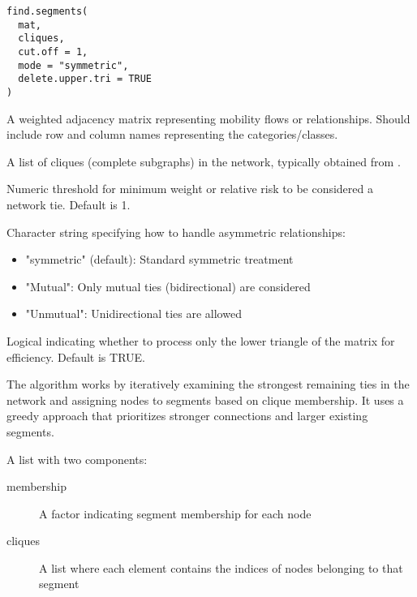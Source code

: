 \documentclass[a4paper]{book}
\begin{document}
%
\begin{Usage}
\begin{verbatim}
find.segments(
  mat,
  cliques,
  cut.off = 1,
  mode = "symmetric",
  delete.upper.tri = TRUE
)
\end{verbatim}
\end{Usage}
%
\begin{Arguments}
\begin{ldescription}
\item[\code{mat}] A weighted adjacency matrix representing mobility flows or relationships.
Should include row and column names representing the categories/classes.

\item[\code{cliques}] A list of cliques (complete subgraphs) in the network, typically
obtained from .

\item[\code{cut.off}] Numeric threshold for minimum weight or relative risk to be 
considered a network tie. Default is 1.

\item[\code{mode}] Character string specifying how to handle asymmetric relationships:
\begin{itemize}

\item{} "symmetric" (default): Standard symmetric treatment
\item{} "Mutual": Only mutual ties (bidirectional) are considered
\item{} "Unmutual": Unidirectional ties are allowed

\end{itemize}


\item[\code{delete.upper.tri}] Logical indicating whether to process only the lower 
triangle of the matrix for efficiency. Default is TRUE.
\end{ldescription}
\end{Arguments}
%
\begin{Details}
The algorithm works by iteratively examining the strongest remaining ties in the
network and assigning nodes to segments based on clique membership. It uses a
greedy approach that prioritizes stronger connections and larger existing segments.
\end{Details}
%
\begin{Value}
A list with two components:
\begin{description}

\item[membership] A factor indicating segment membership for each node
\item[cliques] A list where each element contains the indices of nodes 
belonging to that segment

\end{description}

\end{Value}
\end{document}
